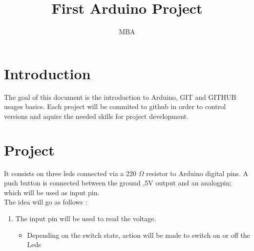 \documentclass[12pt,a4paper]{article}
\author{MBA}
\title{First Arduino Project }
\begin{document}
	\maketitle
	\section{Introduction}
	
	The goal of this document is the introduction to Arduino, GIT and GITHUB usages basics. Each project will be commited to github in order to control versions and aquire the needed skills for project development.
	
	\section{Project }
	
	It consists on three leds connected via a 220 $\Omega$ resistor to Arduino digital pins. A push button is connected between the ground ,5V output and an analogpin; which will be used as input pin. \\
	
	The idea will go as follows : 
	
	\begin{enumerate}
		\item The input pin will be used to read the voltage.
			\begin{itemize}
				\item Depending on the switch state, action will be made to switch on or off the Leds 
			\end{itemize}
	\end{enumerate}
	
\end{document}
